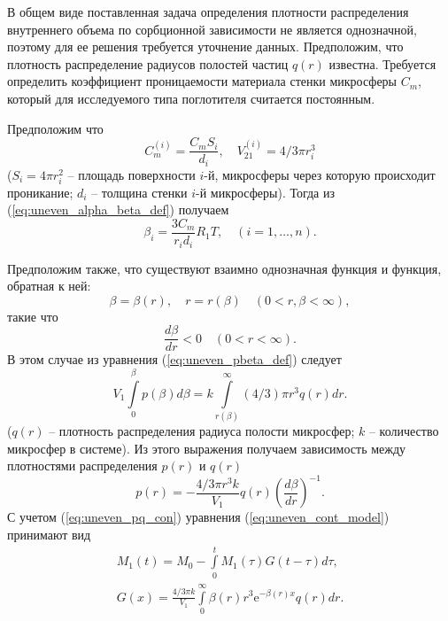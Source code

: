 В общем виде поставленная задача определения плотности распределения внутреннего объема по сорбционной зависимости не является однозначной, поэтому для ее решения требуется уточнение данных. Предположим, что плотность распределение радиусов полостей частиц $q(r)$ известна.  Требуется определить коэффициент проницаемости материала стенки микросферы $C_m$, который для исследуемого типа поглотителя считается постоянным.

Предположим что
\[
C_m^{(i)} = \frac{C_m S_i}{d_i}, \quad V_{21}^{(i)} = 4/3\pi r_i^3
\]
($S_i=4 \pi r_i^2$ -- площадь поверхности $i$-й, микросферы через которую происходит проникание; $d_i$ -- толщина стенки $i$-й микросферы). Тогда из (\ref{eq:uneven_alpha_beta_def}) получаем
\begin{equation*}
\beta_i = \frac{3 C_m}{r_i d_i} R_1 T, \quad (i=1,\ldots, n).
\end{equation*}

Предположим также, что существуют взаимно однозначная функция и функция, обратная к ней:
\begin{equation*}
\label{eq:uneven_betar_con}
\beta = \beta(r), \quad r=r(\beta) \quad (0 < r, \beta < \infty),
\end{equation*}
такие что 
\[
\frac{d\beta}{dr} < 0 \quad (0 < r < \infty).
\]
В этом случае из уравнения (\ref{eq:uneven_pbeta_def})  следует
\begin{equation*}
V_1 \int\limits_0^{\beta}p(\beta)d\beta = k \int\limits_{r(\beta)}^{\infty}(4/3)\pi r^3 q(r) dr.
\end{equation*}
($q(r)$ -- плотность распределения радиуса полости микросфер; $k$ -- количество микросфер в системе). Из этого выражения получаем зависимость между плотностями распределения $p(r)$ и $q(r)$
\begin{equation}
\label{eq:uneven_pq_con}
p(r) = - \frac{4/3 \pi r^3 k}{V_1}  q(r) \left( \frac{d\beta}{dr} \right)^{-1}.
\end{equation}
С учетом (\ref{eq:uneven_pq_con}) уравнения (\ref{eq:uneven_cont_model}) принимают вид
\begin{equation}
\label{eq:uneven_cont_model_qr}
\begin{array}{c}
M_1(t)=M_0-\int\limits_{0}^{t}  M_1(\tau)  G(t-\tau) d\tau, \\
G(x) = \displaystyle\frac{4/3 \pi k}{V_1} \int\limits_{0}^{\infty}\beta(r) r^3  \mathrm{e}^{-\beta(r) x} q(r) dr.
\end{array}
\end{equation}



